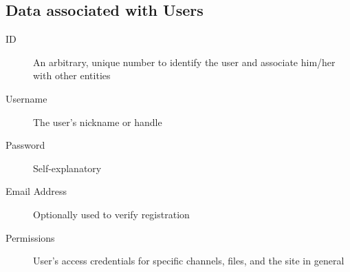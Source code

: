 \documentclass[a4paper,12pt]{report}
\begin{document}
\subsection{Data associated with Users}
\begin{description}
\item[ID] An arbitrary, unique number to identify the user and associate him/her with other entities
\item[Username] The user's nickname or handle
\item[Password] Self-explanatory
\item[Email Address] Optionally used to verify registration
\item[Permissions] User's access credentials for specific channels, files, and the site in general
\end{description}
\end{document}
